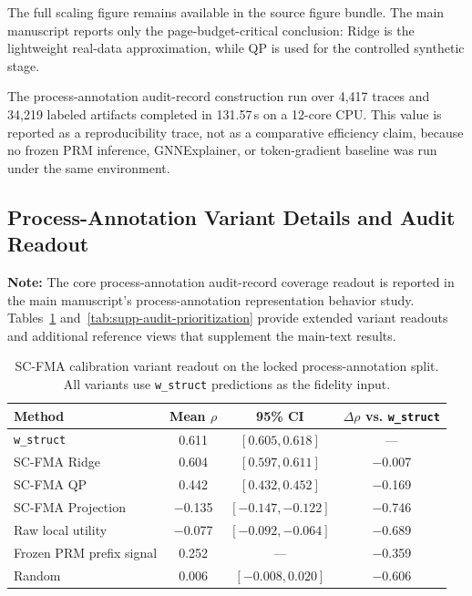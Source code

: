 \documentclass[pdflatex,sn-mathphys-num]{sn-jnl}
\begin{document}
The full scaling figure remains available in the source figure bundle. The main manuscript reports only the page-budget-critical conclusion: Ridge is the lightweight real-data approximation, while QP is used for the controlled synthetic stage.

The process-annotation audit-record construction run over 4,417 traces and 34,219 labeled artifacts completed in 131.57\,s on a 12-core CPU. This value is reported as a reproducibility trace, not as a comparative efficiency claim, because no frozen PRM inference, GNNExplainer, or token-gradient baseline was run under the same environment.

\subsection{Process-Annotation Variant Details and Audit Readout}
\label{app:prm800k-variant-details}

\noindent\textbf{Note:} The core process-annotation audit-record coverage readout is reported in the main manuscript's process-annotation representation behavior study. Tables~\ref{tab:supp-scfma-variants} and~\ref{tab:supp-audit-prioritization} provide extended variant readouts and additional reference views that supplement the main-text results.

\begin{table}[ht]
\caption{SC-FMA calibration variant readout on the locked process-annotation split. All variants use \texttt{w\_struct} predictions as the fidelity input.}
\label{tab:supp-scfma-variants}
\centering
\small
\begin{tabular}{lccc}
\toprule
\textbf{Method} & \textbf{Mean $\rho$} & \textbf{95\% CI} & \textbf{$\Delta\rho$ vs. \texttt{w\_struct}} \\
\midrule
\texttt{w\_struct} & 0.611 & $[0.605,0.618]$ & --- \\
SC-FMA Ridge & 0.604 & $[0.597,0.611]$ & $-$0.007 \\
SC-FMA QP & 0.442 & $[0.432,0.452]$ & $-$0.169 \\
SC-FMA Projection & $-$0.135 & $[-0.147,-0.122]$ & $-$0.746 \\
Raw local utility & $-$0.077 & $[-0.092,-0.064]$ & $-$0.689 \\
Frozen PRM prefix signal & 0.252 & --- & $-$0.359 \\
Random & 0.006 & $[-0.008,0.020]$ & $-$0.606 \\
\bottomrule
\end{tabular}
\end{table}
\end{document}
